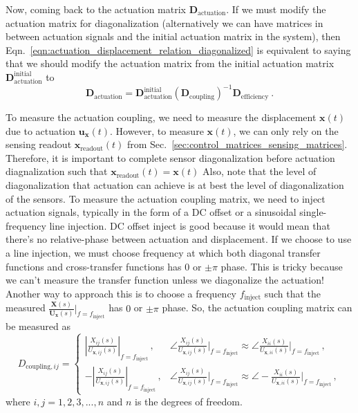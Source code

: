 Now, coming back to the actuation matrix $\mathbf{D}_\mathrm{actuation}$.
If we must modify the actuation matrix for diagonalization (alternatively we can have matrices in between actuation signals and the initial actuation matrix in the system), then Eqn.~\eqref{eqn:actuation_displacement_relation_diagonalized} is equivalent to saying that we should modify the actuation matrix from the initial actuation matrix $\mathbf{D}_\mathrm{actuation}^\mathrm{initial}$ to
\begin{equation}
	\boxed{
		\mathbf{D}_\mathrm{actuation} = \mathbf{D}_\mathrm{actuation}^\mathrm{initial} \left(\mathbf{D}_\mathrm{coupling}\right)^{-1} \mathbf{D}_\mathrm{efficiency}
	}\ .
	\label{eqn:actuation_matrix_diagonalized}
\end{equation}

To measure the actuation coupling, we need to measure the displacement $\mathbf{x}(t)$ due to actuation $\mathbf{u}_\mathbf{x}(t)$.
However, to measure $\mathbf{x}(t)$, we can only rely on the sensing readout $\mathbf{x}_\mathrm{readout}(t)$ from Sec.~\ref{sec:control_matrices_sensing_matrices}.
Therefore, it is important to complete sensor diagonalization before actuation diagnalization such that $\mathbf{x}_\mathrm{readout}(t)=\mathbf{x}(t)$
Also, note that the level of diagonalization that actuation can achieve is at best the level of diagonalization of the sensors.
To measure the actuation coupling matrix, we need to inject actuation signals, typically in the form of a DC offset or a sinusoidal single-frequency line injection.
DC offset inject is good because it would mean that there's no relative-phase between actuation and displacement.
If we choose to use a line injection, we must choose frequency at which both diagonal transfer functions and cross-transfer functions has $0$ or $\pm\pi$ phase.
This is tricky because we can't measure the transfer function unless we diagonalize the actuation!
Another way to approach this is to choose a frequency $f_\mathrm{inject}$ such that the measured $\frac{\mathbf{X}(s)}{\mathbf{U}_\mathbf{x}(s)}\big\rvert_{f=f_\mathrm{inject}}$ has $0$ or $\pm\pi$ phase.
So, the actuation coupling matrix can be measured as
\begin{equation}
	\boxed{
		D_{\mathrm{coupling}, ij} =
		\begin{cases}
			\left\lvert\frac{X_{ij}(s)}{U_{\mathbf{x}, ij}(s)}\right\rvert_{f=f_\mathrm{inject}}\,, & \angle\frac{X_{ij}(s)}{U_{\mathbf{x}, ij}(s)}\Big\rvert_{f=f_\mathrm{inject}} \approx \angle\frac{X_{ii}(s)}{U_{\mathbf{x}, ii}(s)}\Big\rvert_{f=f_\mathrm{inject}}\,,\\
			-\left\lvert\frac{X_{ij}(s)}{U_{\mathbf{x}, ij}(s)}\right\rvert_{f=f_\mathrm{inject}}\,, & \angle\frac{X_{ij}(s)}{U_{\mathbf{x}, ij}(s)}\Big\rvert_{f=f_\mathrm{inject}} \approx \angle -\frac{X_{ii}(s)}{U_{\mathbf{x}, ii}(s)}\Big\rvert_{f=f_\mathrm{inject}}\,,
		\end{cases}	
}
\end{equation}
where $i,j = 1,2,3,...,n$ and $n$ is the degrees of freedom.

